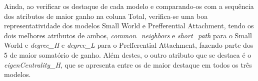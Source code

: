 \documentclass[a4paper,11pt]{article}
\begin{document}
Ainda, ao verificar os destaque de cada modelo e comparando-os com a sequência dos atributos de maior ganho na coluna Total, verifica-se uma boa representatividade dos modelos Small World e Prefferential Attachment, tendo os dois melhores atributos de ambos, \textit{common\_neighbors} e \textit{short\_path} para o Small World e \textit{degree\_H} e \textit{degree\_L} para o Prefferential Attachment, fazendo parte dos 5 de maior somatório de ganho. Além destes, o outro atributo que se destaca é o \textit{eigenCentrality\_H}, que se apresenta entre os de maior destaque em todos os três modelos.%





\end{document}
